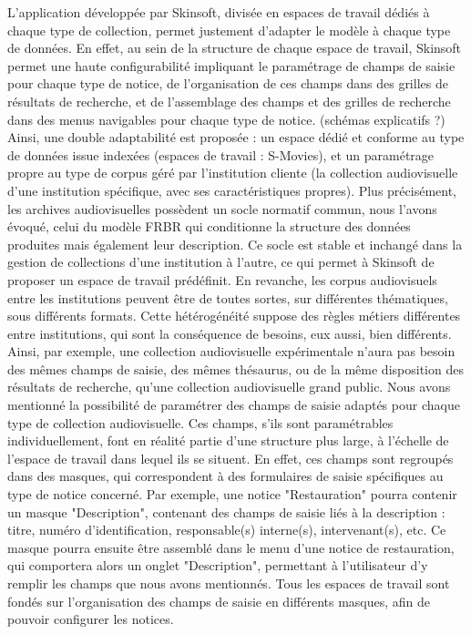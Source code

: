 L'application développée par Skinsoft, divisée en espaces de travail dédiés à chaque type de collection, permet justement d'adapter le modèle à chaque type de données. En effet, au sein de la structure de chaque espace de travail, Skinsoft permet une haute configurabilité impliquant le paramétrage de champs de saisie pour chaque type de notice, de l'organisation de ces champs dans des grilles de résultats de recherche, et de l'assemblage des champs et des grilles de recherche dans des menus navigables pour chaque type de notice. (schémas explicatifs ?)
Ainsi, une double adaptabilité est proposée : un espace dédié et conforme au type de données issue indexées (espaces de travail : S-Movies), et un paramétrage propre au type de corpus géré par l'institution cliente (la collection audiovisuelle d'une institution spécifique, avec ses caractéristiques propres). 
Plus précisément, les archives audiovisuelles possèdent un socle normatif commun, nous l'avons évoqué, celui du modèle FRBR qui conditionne la structure des données produites mais également leur description. Ce socle est stable et inchangé dans la gestion de collections d'une institution à l'autre, ce qui permet à Skinsoft de proposer un espace de travail prédéfinit. En revanche, les corpus audiovisuels entre les institutions peuvent être de toutes sortes, sur différentes thématiques, sous différents formats. Cette hétérogénéité suppose des règles métiers différentes entre institutions, qui sont la conséquence de besoins, eux aussi, bien différents. Ainsi, par exemple, une collection audiovisuelle expérimentale n'aura pas besoin des mêmes champs de saisie, des mêmes thésaurus, ou de la même disposition des résultats de recherche, qu'une collection audiovisuelle grand public.  
Nous avons mentionné la possibilité de paramétrer des champs de saisie adaptés pour chaque type de collection audiovisuelle. Ces champs, s'ils sont paramétrables individuellement, font en réalité partie d'une structure plus large, à l'échelle de l'espace de travail dans lequel ils se situent. En effet, ces champs sont regroupés dans des masques, qui correspondent à des formulaires de saisie spécifiques au type de notice concerné. Par exemple, une notice "Restauration" pourra contenir un masque "Description", contenant des champs de saisie liés à la description : titre, numéro d'identification, responsable(s) interne(s), intervenant(s), etc. Ce masque pourra ensuite être assemblé dans le menu d'une notice de restauration, qui comportera alors un onglet "Description", permettant à l'utilisateur d'y remplir les champs que nous avons mentionnés. Tous les espaces de travail sont fondés sur l'organisation des champs de saisie en différents masques, afin de pouvoir configurer les notices. 
